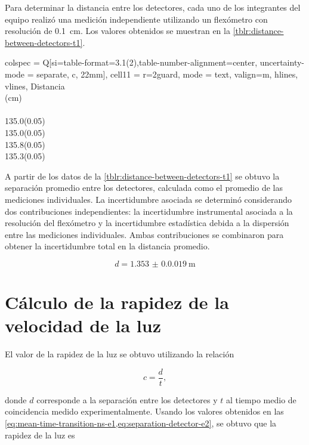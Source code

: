 \documentclass[12pt]{IEEEtran}
\begin{document}
Para determinar la distancia entre los detectores, cada uno de los integrantes
del equipo realizó una medición independiente utilizando un flexómetro con resolución de \qty{0.1}{\cm}. Los valores obtenidos se muestran en la \cref{tblr:distance-between-detectors-t1}.

\begin{table}[htb]
	\centering
	\begin{tblr}{
			colspec = { Q[si={table-format=3.1(2),table-number-alignment=center, uncertainty-mode = separate}, c, 22mm]},
			cell{1}{1} = {r=2}{guard, mode = text, valign=m},
			hlines,
			vlines,
		}
		{ Distancia   \\
		(\unit{\cm})} \\
		\\
		135.0(0.05)   \\
		135.0(0.05)   \\
		135.8(0.05)   \\
		135.3(0.05)
	\end{tblr}
	\caption{Mediciones de la separación entre detectores realizada por cada
		integrante del equipo.}
	\label{tblr:distance-between-detectors-t1}
\end{table}

A partir de los datos de la \cref{tblr:distance-between-detectors-t1}
se obtuvo la separación promedio entre los detectores, calculada como el
promedio de las mediciones individuales. La incertidumbre asociada se determinó
considerando dos contribuciones independientes: la incertidumbre instrumental
asociada a la resolución del flexómetro y la incertidumbre estadística debida a
la dispersión entre las mediciones individuales. Ambas contribuciones se
combinaron para obtener la incertidumbre total en la distancia promedio.

\begin{equation}
	d = \qty{1.353(0.0019)}{\m}
	\label{eq:separation-detector-e2}
\end{equation}

\section{Cálculo de la rapidez de la velocidad de la luz}

El valor de la rapidez de la luz se obtuvo utilizando la relación

\begin{equation*}
	c = \dfrac{d}{t},
\end{equation*}

donde \(d\) corresponde a la separación entre los detectores y \(t\) al tiempo
medio de coincidencia medido experimentalmente. Usando los valores obtenidos en
las
\cref{eq:mean-time-transition-ns-e1,eq:separation-detector-e2},
se obtuvo que la rapidez de la luz es
\end{document}
